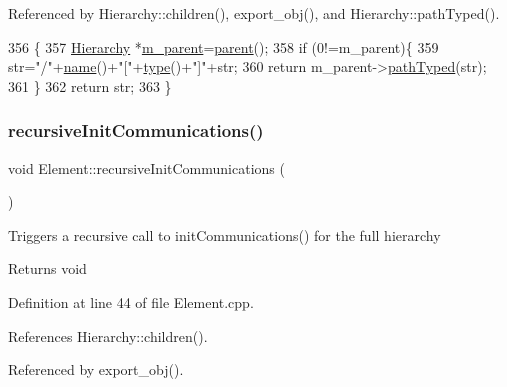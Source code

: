 Referenced by Hierarchy\+::children(), export\+\_\+obj(), and Hierarchy\+::path\+Typed().


\begin{DoxyCode}
356                                            \{
357   \hyperlink{classHierarchy}{Hierarchy} *\hyperlink{classHierarchy_a5814bb280d4e8539ab25ab6cbfb9cc4f}{m\_parent}=\hyperlink{classHierarchy_a1c7bec8257e717f9c1465e06ebf845fc}{parent}();
358   \textcolor{keywordflow}{if} (0!=m\_parent)\{
359     str=\textcolor{stringliteral}{"/"}+\hyperlink{classObject_a300f4c05dd468c7bb8b3c968868443c1}{name}()+\textcolor{stringliteral}{"["}+\hyperlink{classObject_a84f99f70f144a83e1582d1d0f84e4e62}{type}()+\textcolor{stringliteral}{"]"}+str;
360     \textcolor{keywordflow}{return} m\_parent->\hyperlink{classHierarchy_a1efd56cd164d328d2002e53a10a19b8c}{pathTyped}(str);
361   \}
362   \textcolor{keywordflow}{return} str;
363 \}
\end{DoxyCode}
\mbox{\label{classElement_a82119ed37dff76508a2746a853ec35ba}} 
\subsubsection{\texorpdfstring{recursive\+Init\+Communications()}{recursiveInitCommunications()}}
{\footnotesize\ttfamily void Element\+::recursive\+Init\+Communications (\begin{DoxyParamCaption}{ }\end{DoxyParamCaption})\hspace{0.3cm}{\ttfamily [inherited]}}

Triggers a recursive call to init\+Communications() for the full hierarchy

\begin{DoxyReturn}{Returns}
void 
\end{DoxyReturn}


Definition at line 44 of file Element.\+cpp.



References Hierarchy\+::children().



Referenced by export\+\_\+obj().


